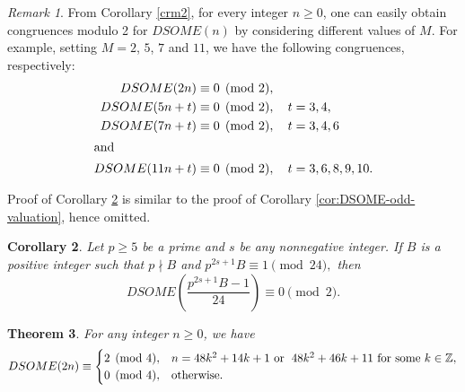 \documentclass[12pt]{article}
\numberwithin{equation}{section}
\newtheorem{theorem}{Theorem}[section]
\newtheorem{corollary}[theorem]{Corollary}
\theoremstyle{definition}
\theoremstyle{remark}
\newtheorem{remark}[theorem]{Remark}
\numberwithin{equation}{section}
\begin{document}
\begin{remark}
From Corollary \ref{crm2}, for every integer $n\geq0$, one can easily obtain  congruences  modulo 2 for
$DSOME(n)$ by considering different values of $M$. For example, setting $M=2$, $5$, $7$ and $11$, we have the following congruences, respectively:
\begin{align*}
DSOME(2n)
&\equiv0\pmod2,\\
DSOME(5n+t)
&
\equiv0\pmod2,\quad t=3, 4, \\
DSOME(7n+t)
&\equiv0\pmod2, \quad t=3, 4, 6\\\intertext{and}
DSOME(11n+t)&
\equiv0\pmod2, \quad t=3, 6, 8, 9, 10.
\end{align*}
\end{remark}

Proof of Corollary \ref{cio} is similar to the proof of Corollary \ref{cor:DSOME-odd-valuation}, hence omitted.

\begin{corollary}\label{cio}
Let $p\geq5$ be a prime and  $s$ be any nonnegative integer. If $B$ is a positive
integer such that $p\nmid B$ and
$
p^{2s+1}B\equiv1\pmod{24},
$
then
\begin{equation*}
DSOME
\left(
\dfrac{p^{2s+1}B-1}{24}
\right)
\equiv0\pmod2.
\end{equation*}
\end{corollary}

\begin{theorem}\label{T1}
For any integer $n\ge0$, we have
\begin{equation*}
DSOME(2n)\equiv
\begin{cases}
2\pmod4,
& n=48k^2+14k+1 \text{ or \;$48k^2+46k+11$}\text{ for some }k\in\mathbb Z,\\
0\pmod4,
& \text{otherwise}.
\end{cases}
\end{equation*}
\end{theorem}
\end{document}
